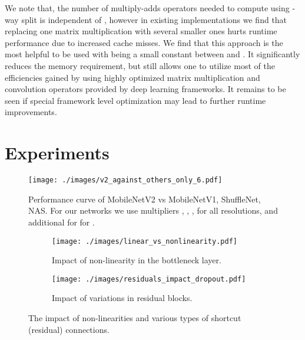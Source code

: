 \documentclass[10pt,twocolumn,letterpaper]{article}
\begin{document}
We note that, the  number of multiply-adds operators needed to compute  using -way split is independent of , however in existing implementations we find that replacing one matrix multiplication with several smaller ones hurts runtime performance due to increased cache misses. We find that this approach is the most helpful to be used with  being a small constant between  and . It significantly reduces the memory requirement, but still allows one to utilize most of the efficiencies gained by using highly optimized matrix multiplication and convolution operators provided by deep learning frameworks. It remains to be seen if special framework level optimization may lead to further runtime improvements. 
 
\newcommand\omt[1]{}

\section{Experiments}
\label{sec:experiments}

\begin{figure}
    \centering
    \texttt{[image: ./images/v2\_against\_others\_only\_6.pdf]}
    \caption{
        Performance curve of \mbox{MobileNetV2} vs \mbox{MobileNetV1}, \mbox{ShuffleNet}, \mbox{NAS}.
        For our networks we use multipliers , , ,  for all resolutions, and additional  for for . \beveco
    }
    \label{fig:performance_curve}
\end{figure}



\begin{figure}
    \centering
    \begin{subfigure}{0.23\textwidth}
        \centering
        \texttt{[image: ./images/linear\_vs\_nonlinearity.pdf]}
        \caption{Impact of non-linearity in the bottleneck layer.}
        \label{fig:linearity-impact}
    \end{subfigure}
    \begin{subfigure}{0.23\textwidth}
        \texttt{[image: ./images/residuals\_impact\_dropout.pdf]}
        \caption{Impact of variations in residual blocks.}
        \label{fig:residual-impact}
    \end{subfigure}
    \caption{
        The impact of non-linearities and various types of shortcut (residual) connections.
    }
\end{figure}
\end{document}
